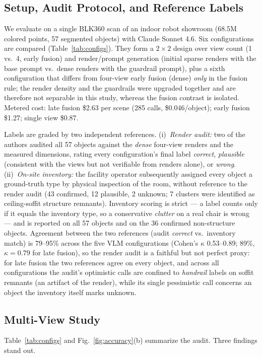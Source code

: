 \documentclass[conference]{IEEEtran}
\begin{document}
\subsection{Setup, Audit Protocol, and Reference Labels}
\label{sec:setup}
We evaluate on a single BLK360 scan of an indoor robot showroom (68.5M
colored points, 57 segmented objects) with Claude Sonnet 4.6. Six
configurations are compared (Table~\ref{tab:configs}). They form a
$2\times2$ design over view count (1 vs.\ 4, early fusion) and render/prompt
generation (initial sparse renders with the base prompt vs.\ dense renders
with the guardrail prompt), plus a sixth configuration that differs from
four-view early fusion (dense) \emph{only} in the fusion rule; the render
density and the guardrails were upgraded together and are therefore not
separable in this study, whereas the fusion contrast is isolated. Metered
cost: late fusion \$2.63 per scene (285 calls, \$0.046/object); early
fusion \$1.27; single view \$0.87.

Labels are graded by two independent references. (i)~\emph{Render audit:}
two of the authors audited all 57 objects against the \emph{dense}
four-view renders and the measured dimensions, rating every
configuration's final label \emph{correct}, \emph{plausible} (consistent
with the views but not verifiable from renders alone), or \emph{wrong}.
(ii)~\emph{On-site inventory:} the facility operator subsequently assigned
every object a ground-truth type by physical inspection of the room,
without reference to the render audit (43 confirmed, 12 plausible, 2
unknown; 7 clusters were identified as ceiling-soffit structure remnants).
Inventory scoring is strict --- a label counts only if it equals the
inventory type, so a conservative \emph{clutter} on a real chair is wrong
--- and is reported on all 57 objects and on the 36 confirmed non-structure
objects. Agreement between the two references (audit \emph{correct} vs.\
inventory match) is 79--95\% across the five VLM configurations (Cohen's
$\kappa$ 0.53--0.89; 89\%, $\kappa=0.79$ for late fusion), so the render
audit is a faithful but not perfect proxy: for late fusion the two
references agree on every object, and across all configurations the
audit's optimistic calls are confined to \emph{handrail} labels on
soffit remnants (an artifact of the render), while its single
pessimistic call concerns an object the inventory itself marks unknown.

\subsection{Multi-View Study}
\label{sec:study}
Table~\ref{tab:configs} and Fig.~\ref{fig:accuracy}(b) summarize the
audit. Three findings stand out.
\end{document}
